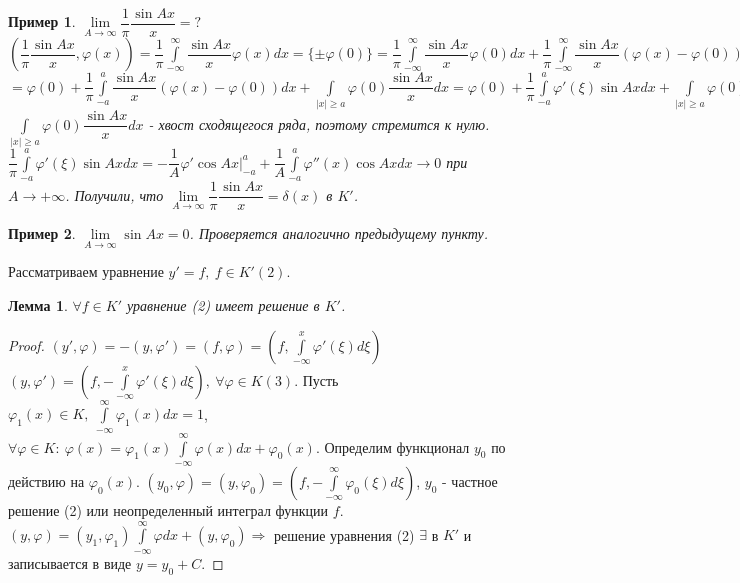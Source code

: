 \documentclass[9pt, a4paper]{article}
\newtheorem*{lemma}{Лемма}
\newtheorem*{sample}{Пример}
\begin{document}
			\begin{sample}
				$\lim\limits_{A \to \infty} \dfrac{1}{\pi} \dfrac{\sin{Ax}}{x}	 = ?$\newline
				$(\dfrac{1}{\pi} \dfrac{\sin{Ax}}{x}, \varphi(x)) = \dfrac1\pi \int\limits_{-\infty}^{\infty} \dfrac{\sin{Ax}}{x}\varphi(x) dx = \{\pm \varphi(0)\} = 
				\dfrac1\pi \int\limits_{-\infty}^{\infty} \dfrac{\sin{Ax}}{x} \varphi(0) dx + \dfrac1\pi \int\limits_{-\infty}^{\infty} \dfrac{\sin{Ax}}{x} (\varphi(x) -\varphi(0)) dx = $\newline$=\varphi(0) + \dfrac1\pi \int\limits_{-a}^{a} \dfrac{\sin{Ax}}{x} (\varphi(x) -\varphi(0)) dx + \int\limits_{|x| \geq a} \varphi(0) \dfrac{\sin{Ax}}{x}dx = \varphi(0) + \dfrac{1}{\pi} \int\limits_{-a}^{a} \varphi'(\xi) \sin{Ax} dx+\int\limits_{|x| \geq a} \varphi(0) \dfrac{\sin{Ax}}{x}dx$\newline
				$\int\limits_{|x| \geq a} \varphi(0) \dfrac{\sin{Ax}}{x}dx$ - хвост сходящегося ряда, поэтому стремится к нулю. \newline
				$\dfrac{1}{\pi} \int\limits_{-a}^{a} \varphi'(\xi) \sin{Ax} dx = -\dfrac1{A} \varphi' \cos{Ax} \vert_{-a}^a + \dfrac{1}{A} \int\limits_{-a}^{a} \varphi''(x) \cos{Ax} dx \to 0$ при $A \to + \infty$.\newline
				Получили, что $\lim\limits_{A \to \infty} \dfrac{1}{\pi} \dfrac{\sin{Ax}}{x} = \delta(x)$ в $K'$.
			\end{sample}
			\begin{sample}
				$\lim\limits_{A \to \infty} \sin{Ax} = 0$. Проверяется аналогично предыдущему пункту.
			\end{sample}
			Рассматриваем уравнение $y' = f, \ f \in K' (2)$.
			\begin{lemma}
				$\forall f \in K'$ уравнение (2) имеет решение в $K'$.
			\end{lemma}
			\begin{proof}
				$(y', \varphi) = -(y, \varphi') = (f, \varphi) = (f, \int\limits_{-\infty}^{x} \varphi'(\xi) d\xi)$\newline
				$(y, \varphi') = (f, - \int\limits_{-\infty}^{x} \varphi'(\xi) d\xi), \ \forall \varphi \in K (3)$. Пусть $\varphi_1(x) \in K, \ \int\limits_{-\infty}^{\infty} \varphi_1(x) dx = 1$, $\forall \varphi \in K: \ \varphi(x) = \varphi_1(x) \int\limits_{-\infty}^{\infty} \varphi(x) dx + \varphi_0(x)$. Определим функционал $y_0$ по действию на $\varphi_0(x)$. $(y_0, \varphi) = (y, \varphi_0) = (f, - \int\limits_{-\infty}^{\infty} \varphi_0(\xi) d\xi)$, $y_0$ - частное решение (2) или неопределенный интеграл функции $f$. $(y, \varphi) = (y_1, \varphi_1) \int\limits_{-\infty}^{\infty} \varphi dx + (y, \varphi_0) \Rightarrow$ решение уравнения (2) $\exists$ в $K'$ и записывается в виде $y = y_0 + C$. 
			\end{proof}
\end{document}
